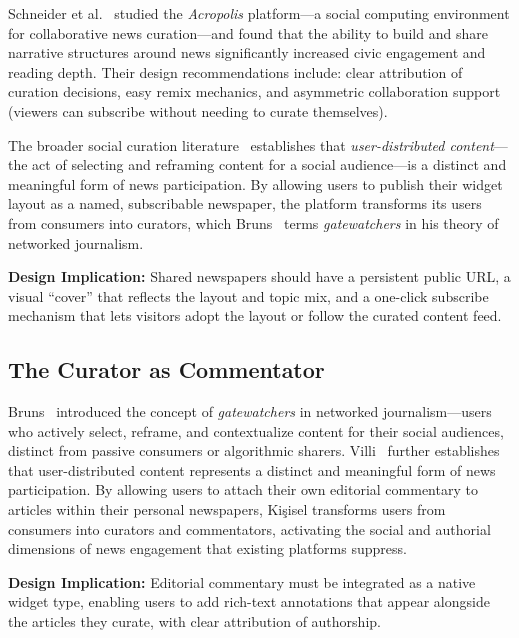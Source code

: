 \documentclass[14pt]{article}
\begin{document}
Schneider et al.~\cite{schneider2017} studied the \emph{Acropolis} platform---a social computing environment for collaborative news curation---and found that the ability to build and share narrative structures around news significantly increased civic engagement and reading depth. Their design recommendations include: clear attribution of curation decisions, easy remix mechanics, and asymmetric collaboration support (viewers can subscribe without needing to curate themselves).

The broader social curation literature~\cite{villi2012} establishes that \emph{user-distributed content}---the act of selecting and reframing content for a social audience---is a distinct and meaningful form of news participation. By allowing users to publish their widget layout as a named, subscribable newspaper, the platform transforms its users from consumers into curators, which Bruns~\cite{bruns2005} terms \emph{gatewatchers} in his theory of networked journalism.

\smallskip
\noindent\textbf{Design Implication:} Shared newspapers should have a persistent public URL, a visual ``cover'' that reflects the layout and topic mix, and a one-click subscribe mechanism that lets visitors adopt the layout or follow the curated content feed.

\subsection{The Curator as Commentator}

Bruns~\cite{bruns2005} introduced the concept of \emph{gatewatchers} in networked journalism---users who actively select, reframe, and contextualize content for their social audiences, distinct from passive consumers or algorithmic sharers. Villi~\cite{villi2012} further establishes that user-distributed content represents a distinct and meaningful form of news participation. By allowing users to attach their own editorial commentary to articles within their personal newspapers, Ki\c{s}isel transforms users from consumers into curators and commentators, activating the social and authorial dimensions of news engagement that existing platforms suppress.

\smallskip
\noindent\textbf{Design Implication:} Editorial commentary must be integrated as a native widget type, enabling users to add rich-text annotations that appear alongside the articles they curate, with clear attribution of authorship.

\end{document}

